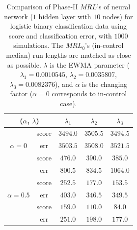 \documentclass[twoside,11pt]{article}
\begin{document}
\begin{table}[!t]
\centering
\begin{tabular}{ccccc}
\toprule
\multicolumn{2}{c}{($ \alpha$, $ \lambda$)} & {$ \lambda_1$} & {$ \lambda_2$} & {$ \lambda_3$} \\
\midrule
\multirow{3}{*}{$\alpha=0$} & score &$3494.0$ & $3505.5$ & $3494.5$ \\
& err &$3503.5$ & $3508.0$ & $3521.5$ \\
\midrule
\multirow{3}{*}{$\alpha=0.3$} & score &$\bm{476.0}$ & $\bm{390.0}$ & $\bm{385.0}$ \\
& err &$800.5$ & $834.5$ & $1064.0$ \\
\midrule
\multirow{3}{*}{$\alpha=0.5$} & score &$\bm{252.5}$ & $\bm{177.0}$ & $\bm{153.5}$ \\
& err &$403.0$ & $346.5$ & $349.5$ \\
\midrule
\multirow{3}{*}{$\alpha=0.7$} & score &$\bm{159.0}$ & $\bm{110.0}$ & $\bm{84.0}$ \\
& err &$251.0$ & $198.0$ & $177.0$ \\
\midrule
\end{tabular}
\caption{Comparison of Phase-II $MRL$'s of neural network ($1$ hidden layer with $10$ nodes) for logistic binary classification data using score and classification error, with $1000$ simulations. The $MRL_0$'s (in-control median) run lengths are matched as close as possible. $ \lambda$ is the EWMA parameter ({$ \lambda_1=0.0010545$}, {$ \lambda_2=0.0035807$}, {$ \lambda_3=0.0082376$}), and $ \alpha$ is the changing factor ($ \alpha=0$ corresponds to in-control case).}
\label{tab:logi_nnet_MRL}
\end{table}
\end{document}
